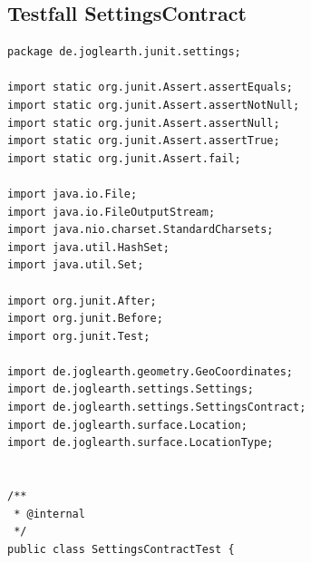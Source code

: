 \documentclass[10pt]{scrreprt}
\begin{document}
\subsection*{Testfall SettingsContract}
\lstset{language=Java}
\begin{lstlisting}
package de.joglearth.junit.settings;

import static org.junit.Assert.assertEquals;
import static org.junit.Assert.assertNotNull;
import static org.junit.Assert.assertNull;
import static org.junit.Assert.assertTrue;
import static org.junit.Assert.fail;

import java.io.File;
import java.io.FileOutputStream;
import java.nio.charset.StandardCharsets;
import java.util.HashSet;
import java.util.Set;

import org.junit.After;
import org.junit.Before;
import org.junit.Test;

import de.joglearth.geometry.GeoCoordinates;
import de.joglearth.settings.Settings;
import de.joglearth.settings.SettingsContract;
import de.joglearth.surface.Location;
import de.joglearth.surface.LocationType;


/**
 * @internal
 */
public class SettingsContractTest {


\end{lstlisting}
\end{document}
